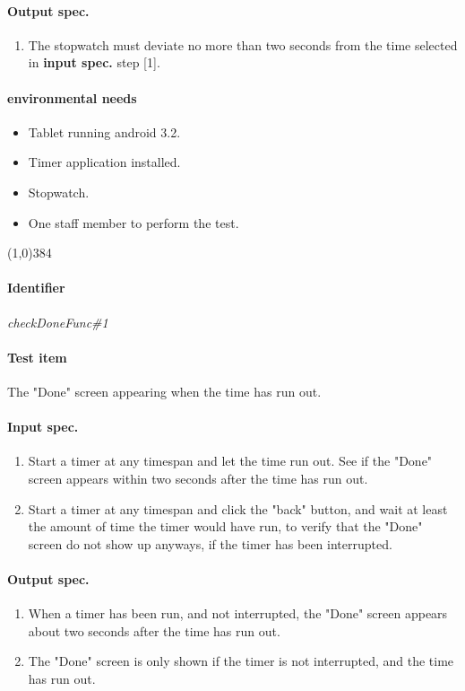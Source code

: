 \paragraph{Output spec.}
	\begin{enumerate}
		\item The stopwatch must deviate no more than two seconds from the time selected in \textbf{input spec.} step [1].
	\end{enumerate}
\paragraph{environmental needs}
	\begin{itemize}
		\item Tablet running android 3.2.
		\item Timer application installed.
		\item Stopwatch.
		\item One staff member to perform the test.
	\end{itemize}
\begin{center}
	\line(1,0){384}
\end{center}

\paragraph{Identifier}
	\textit{checkDoneFunc\#1}
\paragraph{Test item}
	The "Done" screen appearing when the time has run out.
\paragraph{Input spec.}
	\begin{enumerate}
		\item Start a timer at any timespan and let the time run out. See if the "Done" screen appears within two seconds after the time has run out.
		\item Start a timer at any timespan and click the "back" button, and wait at least the amount of time the timer would have run, to verify that the "Done" screen do not show up anyways, if the timer has been interrupted.
	\end{enumerate}
\paragraph{Output spec.}
	\begin{enumerate}
		\item When a timer has been run, and not interrupted, the "Done" screen appears about two seconds after the time has run out.
		\item The "Done" screen is only shown if the timer is not interrupted, and the time has run out.
	\end{enumerate}
